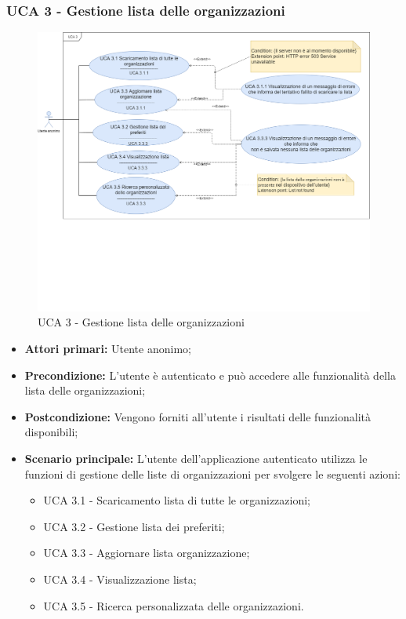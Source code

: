 \newpage


\subsubsection{UCA 3 - Gestione lista delle organizzazioni}%
\begin{figure}[h]
	\centering
	\includegraphics[scale=0.33]{sezioni/UseCase/Immagini/UCA3.png}
	\caption{UCA 3 - Gestione lista delle organizzazioni}
\end{figure}

\begin{itemize}
\item \textbf{Attori primari:} Utente anonimo;
\item \textbf{Precondizione:} L'utente è autenticato e può accedere alle funzionalità della lista delle organizzazioni;
\item \textbf{Postcondizione:} Vengono forniti all'utente i risultati delle funzionalità disponibili;
\item \textbf{Scenario principale:} L'utente dell'applicazione autenticato utilizza le funzioni di gestione delle liste di organizzazioni per svolgere le seguenti azioni:
	\begin{itemize}
		\item UCA 3.1 - Scaricamento lista di tutte le organizzazioni;
		\item UCA 3.2 - Gestione lista dei preferiti;
		\item UCA 3.3 - Aggiornare lista organizzazione;
		\item UCA 3.4 - Visualizzazione lista;
		\item UCA 3.5 - Ricerca personalizzata delle organizzazioni.
	\end{itemize}
\end{itemize}



